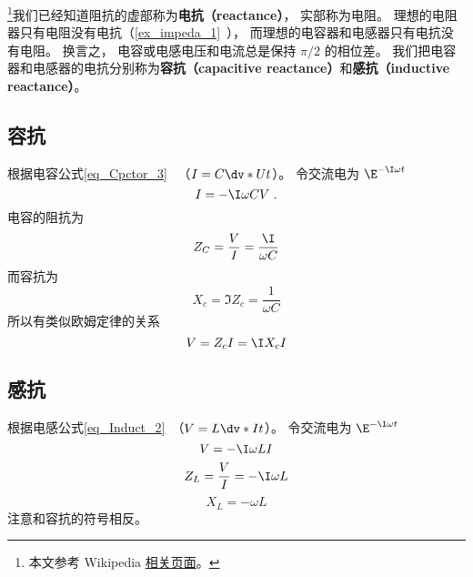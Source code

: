 

\footnote{本文参考 Wikipedia \href{https://en.wikipedia.org/wiki/Electrical_reactance}{相关页面}。}我们已经知道阻抗的虚部称为\textbf{电抗（reactance）}， 实部称为电阻。 理想的电阻器只有电阻没有电抗（\autoref{ex_impeda_1}~）， 而理想的电容器和电感器只有电抗没有电阻。 换言之， 电容或电感电压和电流总是保持 $\pi/2$ 的相位差。 我们把电容器和电感器的电抗分别称为\textbf{容抗（capacitive reactance）}和\textbf{感抗（inductive reactance）}。

\subsection{容抗}
根据电容公式\autoref{eq_Cpctor_3}~ （$I = C\dv*{U}{t}$）。 令交流电为 $\E^{-\I \omega t}$
\begin{equation}
I = -\I \omega CV~.
\end{equation}
电容的阻抗为
\begin{equation}
Z_C = \frac{V}{I} = \frac{\I}{\omega C}
\end{equation}
而容抗为
\begin{equation}
X_c = \Im{Z_c} = \frac{1}{\omega C}
\end{equation}
所以有类似欧姆定律的关系
\begin{equation}
V = Z_c I = \I X_c I
\end{equation}

\subsection{感抗}
根据电感公式\autoref{eq_Induct_2}~（$V = L\dv*{I}{t}$）。 令交流电为 $\E^{-\I \omega t}$
\begin{equation}
V = -\I\omega L I
\end{equation}
\begin{equation}
Z_L = \frac{V}{I} = -\I\omega L
\end{equation}
\begin{equation}
X_L = -\omega L
\end{equation}
注意和容抗的符号相反。
